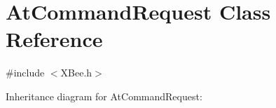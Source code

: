 \hypertarget{class_at_command_request}{}\section{At\+Command\+Request Class Reference}
\label{class_at_command_request}


{\ttfamily \#include $<$X\+Bee.\+h$>$}



Inheritance diagram for At\+Command\+Request\+:
